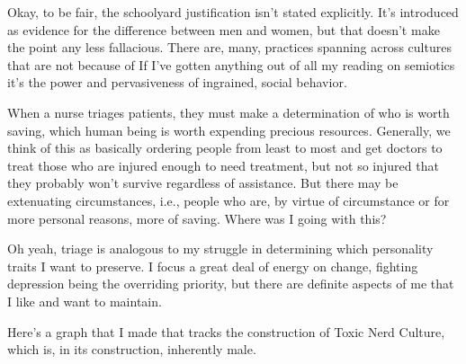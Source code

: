 \documentclass[../butidigress.tex]{subfiles}
\begin{document}
Okay, to be fair, the schoolyard justification isn't stated explicitly.
It's introduced as evidence for the  difference between men and women, but that doesn't make the point any less fallacious.
There are, many, practices spanning across cultures that are not because of 
If I've gotten anything out of all my reading on semiotics it's the power and pervasiveness of ingrained, social behavior.


When a nurse triages patients, they must make a determination of who is worth saving, which human being is worth expending precious resources.
Generally, we think of this as basically ordering people from least to most  and get doctors to treat those who are injured enough to need treatment, but not so injured that they probably won't survive regardless of assistance.
But there may be extenuating circumstances, i.e., people who are, by virtue of circumstance or for more personal reasons, more  of saving.
Where was I going with this?

Oh yeah, triage is analogous to my struggle in determining which personality traits I want to preserve.
I focus a great deal of energy on change, fighting depression being the overriding priority, but there are definite aspects of me that I like and want to maintain.

\newpage
{}
Here's a graph that I made that tracks the construction of Toxic Nerd Culture, which is, in its construction, inherently male.

\begin{figure*}[htp]
\centering
{}
\end{figure*}
\end{document}
